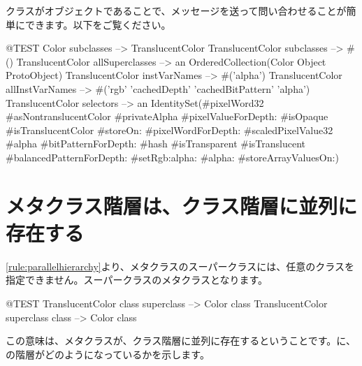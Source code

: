 \documentclass[a4paper,10pt,twoside]{book}
\begin{document}
クラスがオブジェクトであることで、メッセージを送って問い合わせることが簡単にできます。以下をご覧ください。

\begin{code}{@TEST}
Color subclasses                           --> {TranslucentColor}
TranslucentColor subclasses         --> #()
TranslucentColor allSuperclasses  --> an OrderedCollection(Color Object ProtoObject)
TranslucentColor instVarNames     --> #('alpha')
TranslucentColor allInstVarNames --> #('rgb' 'cachedDepth' 'cachedBitPattern' 'alpha')
TranslucentColor selectors             -->  an IdentitySet(#pixelWord32 #asNontranslucentColor #privateAlpha #pixelValueForDepth: #isOpaque #isTranslucentColor #storeOn: #pixelWordForDepth: #scaledPixelValue32 #alpha #bitPatternForDepth: #hash #isTransparent #isTranslucent #balancedPatternForDepth: #setRgb:alpha: #alpha: #storeArrayValuesOn:)
\end{code}

\section{メタクラス階層は、クラス階層に並列に存在する}

\ref{rule:parallelhierarchy}より、メタクラスのスーパークラスには、任意のクラスを指定できません。スーパークラスのメタクラスとなります。

\begin{code}{@TEST}
TranslucentColor class superclass --> Color class
TranslucentColor superclass class --> Color class
\end{code}

\noindent
この意味は、メタクラスが、クラス階層に並列に存在するということです。に、の階層がどのようになっているかを示します。
\end{document}
